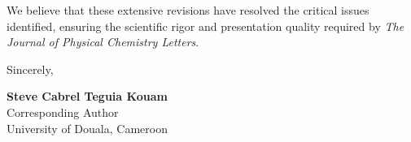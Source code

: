 \documentclass[11pt]{article}
\begin{document}
\vspace{3em}

\noindent We believe that these extensive revisions have resolved the critical issues identified, ensuring the scientific rigor and presentation quality required by \textit{The Journal of Physical Chemistry Letters}.

\vspace{1.5em}

\noindent Sincerely,

\vspace{2.5em}

\noindent \textbf{Steve Cabrel Teguia Kouam}\\
Corresponding Author\\
University of Douala, Cameroon
\end{document}
